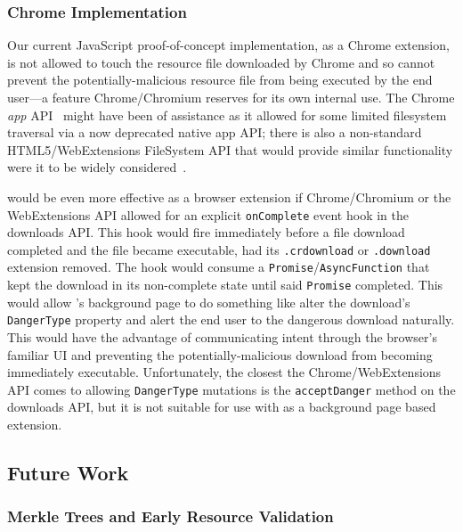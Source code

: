 
\subsubsection{Chrome Implementation}

Our current JavaScript proof-of-concept implementation, as a Chrome extension,
is not allowed to touch the resource file downloaded by Chrome and so cannot
prevent the potentially-malicious resource file from being executed by the end
user---a feature Chrome/Chromium reserves for its own internal use. The Chrome
\textit{app} API~\cite{AppAPI} might have been of assistance as it allowed for
some limited filesystem traversal via a now deprecated native app API; there is
also a non-standard HTML5/WebExtensions FileSystem API that would provide
similar functionality were it to be widely considered~\cite{deadSpec}.

\SYSTEM{} would be even more effective as a browser extension if Chrome/Chromium
or the WebExtensions API allowed for an explicit \texttt{onComplete} event hook
in the downloads API. This hook would fire immediately before a file download
completed and the file became executable, \ie had its \texttt{.crdownload} or
\texttt{.download} extension removed. The hook would consume a
\texttt{Promise}/\texttt{AsyncFunction} that kept the download in its
non-complete state until said \texttt{Promise} completed. This would allow
\SYSTEM{}'s background page to do something like alter the download's
\texttt{DangerType} property and alert the end user to the dangerous download
naturally. This would have the advantage of communicating intent through the
browser's familiar UI and preventing the potentially-malicious download from
becoming immediately executable. Unfortunately, the closest the
Chrome/WebExtensions API comes to allowing \texttt{DangerType} mutations is the
\texttt{acceptDanger} method on the downloads API, but it is not suitable for
use with \SYSTEM{} as a background page based extension.

\subsection{Future Work}

\subsubsection{Merkle Trees and Early Resource Validation}

